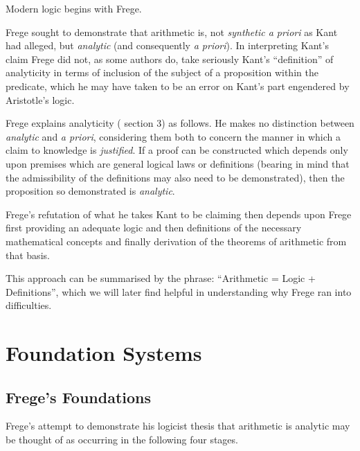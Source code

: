 
Modern logic begins with Frege.

Frege sought to demonstrate that arithmetic is, not {\it synthetic a priori} as Kant had alleged, but {\it analytic} (and consequently {\it a priori}).
In interpreting Kant's claim Frege did not, as some authors do, take seriously Kant's ``definition'' of analyticity in terms of inclusion of the subject of a proposition within the predicate, which he may have taken to be an error on Kant's part engendered by Aristotle's logic.

Frege explains analyticity (\cite{Frege1980} section 3) as follows.
He makes no distinction between {\it analytic} and {\it a priori}, considering them both to concern the manner in which a claim to knowledge is {\it justified}.
If a proof can be constructed which depends only upon premises which are general logical laws or definitions (bearing in mind that the admissibility of the definitions may also need to be demonstrated), then the proposition so demonstrated is {\it analytic}.

Frege's refutation of what he takes Kant to be claiming then depends upon Frege first providing an adequate logic and then definitions of the necessary mathematical concepts and finally derivation of the theorems of arithmetic from that basis.

This approach can be summarised by the phrase: ``Arithmetic = Logic + Definitions'', which we will later find helpful in understanding why Frege ran into difficulties.

\section{Foundation Systems}

\subsection{Frege's Foundations}

Frege's attempt to demonstrate his logicist thesis that arithmetic is analytic may be thought of as occurring in the following four stages.

